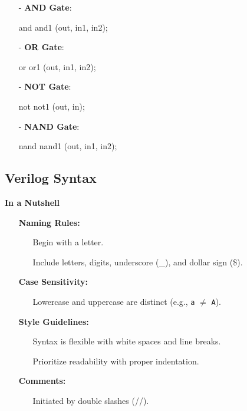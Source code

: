 \documentclass[12pt,openany]{book}
\begin{document}
			      	\begin{itemize}
\item[-] \textbf{AND Gate}:
    \begin{vhdl}
    and and1 (out, in1, in2);
    \end{vhdl}
\item[-] \textbf{OR Gate}:
    \begin{vhdl}
    or or1 (out, in1, in2);
    \end{vhdl}
\item[-] \textbf{NOT Gate}:
    \begin{vhdl}
    not not1 (out, in);
    \end{vhdl}
\item[-] \textbf{NAND Gate}:
    \begin{vhdl}
    nand nand1 (out, in1, in2);
    \end{vhdl}
			      	\end{itemize}
			      	
			      	\subsection{Verilog Syntax}
			      	\textbf{In a Nutshell}
			      	\begin{itemize}
			      		\item[] \textbf{Naming Rules:}
			      		      \begin{itemize}
			      		      	\item[] Begin with a letter.
			      		      	\item[] Include letters, digits, underscore (\_), and dollar sign (\$).
			      		      \end{itemize}
			      		        
			      		\item[] \textbf{Case Sensitivity:}
			      		      \begin{itemize}
			      		      	\item[] Lowercase and uppercase are distinct (e.g., \texttt{a} $\neq$ \texttt{A}).
			      		      \end{itemize}
			      		        
			      		\item[] \textbf{Style Guidelines:}
			      		      \begin{itemize}
			      		      	\item[] Syntax is flexible with white spaces and line breaks.
			      		      	\item[] Prioritize readability with proper indentation.
			      		      \end{itemize}
			      		        
			      		\item[] \textbf{Comments:}
			      		      \begin{itemize}
			      		      	\item[] Initiated by double slashes (//).
			      		      \end{itemize}
			      	\end{itemize}
\end{document}
